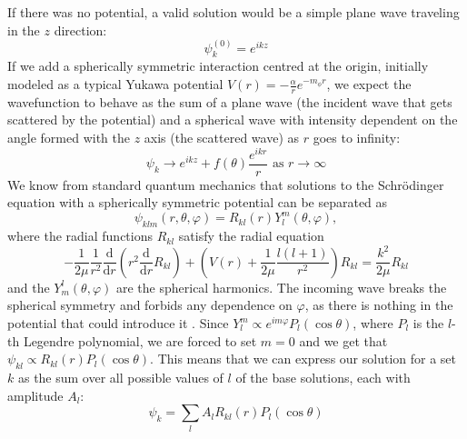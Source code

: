 If there was no potential, a valid solution would be a simple plane wave traveling in the \(z\) direction:
\begin{equation}
	\psi _k^{(0)} = e^{ikz} 
\end{equation}
If we add a spherically symmetric interaction centred at the origin, initially modeled as a typical Yukawa potential \(V(r) =- \frac{\alpha}{r} e^{-m_{\phi } r }\), we expect the wavefunction to behave as the sum of a plane wave (the incident wave that gets scattered by the potential) and a spherical wave with intensity dependent on the angle formed with the \(z\) axis (the scattered wave) as \(r\) goes to infinity:
\begin{equation}\label{deriv:asymptotic}
	\psi _k \to e^{ikz} + f(\theta ) \frac{e^{ikr} }{r} \text{ as } r\to \infty 
\end{equation}
We know from standard quantum mechanics that solutions to the Schrödinger equation with a spherically symmetric potential can be separated as
\begin{equation}
	\psi_{klm} (r,\theta,\varphi) = R_{kl} (r) Y_l^m(\theta , \varphi ),
\end{equation}
where the radial functions \(R_{kl} \) satisfy the radial equation
\begin{equation}\label{deriv:radial}
	-\frac{1}{2\mu } \frac{1}{r^2} \frac{\mathrm{d}}{\mathrm{d}r}\left(r^2 \frac{\mathrm{d}}{\mathrm{d}r}  R_{kl}\right) + \left(V(r)+ \frac{1}{2\mu }\frac{l(l+1)}{r^2}\right)R_{kl} = \frac{k^2}{2\mu }R_{kl} 
\end{equation}
and the \(Y_m^l(\theta , \varphi )\) are the spherical harmonics. The incoming wave breaks the spherical symmetry and forbids any dependence on \(\varphi \), as there is nothing in the potential that could introduce it \cite{griffiths}. Since \(Y_l^m \propto e^{im \varphi} P_l(\cos \theta ) \), where \(P_l\) is the \(l\)-th Legendre polynomial, we are forced to set \(m=0\) and we get that \(\psi_{kl} \propto R_{kl}(r) P_l (\cos \theta )\). This means that we can express our solution for a set \(k\) as the sum over all possible values of \(l\) of the base solutions, each with amplitude \(A_l\):
\begin{equation}\label{deriv:sum}
	\psi _k = \sum_{l} A_l R_{kl} (r) P_l (\cos \theta )
\end{equation}

